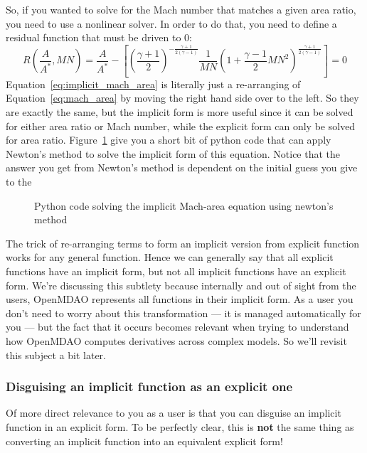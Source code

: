 \documentclass[conf]{new-aiaa}
\begin{document}
So, if you wanted to solve for the Mach number that matches a given area ratio, you need to use a nonlinear solver. 
In order to do that, you need to define a residual function that must be driven to 0: 
\begin{equation}
    R(\frac{A}{A^*}, MN) = \frac{A}{A^*} - \left[ \left(\frac{\gamma+1}{2}\right)^{-\frac{\gamma+1}{2(\gamma-1)}} 
                    \frac{1}{MN} 
                    \left( 1 + \frac{\gamma-1}{2}MN^2 \right)^{\frac{\gamma+1}{2(\gamma-1)}}\right] = 0
                    \label{eq:implicit_mach_area}
\end{equation}
Equation~\eqref{eq:implicit_mach_area} is literally just a re-arranging of Equation~\eqref{eq:mach_area} by moving the right hand side over to the left. 
So they are exactly the same, but the implicit form is more useful since it can be solved for either area ratio or Mach number, while the explicit form can only be solved for area ratio. 
Figure~\ref{fig:mach-area-implicit} give you a short bit of python code that can apply Newton's method to solve the implicit form of this equation. 
Notice that the answer you get from Newton's method is dependent on the initial guess you give to the
\begin{figure}[H]
    \centering
    
    \caption{Python code solving the implicit Mach-area equation using newton's method}
    \label{fig:mach-area-implicit}
\end{figure}

The trick of re-arranging terms to form an implicit version from explicit function works for any general function.
Hence we can generally say that all explicit functions have an implicit form, but not all implicit functions have an explicit form. 
We're discussing this subtlety because internally and out of sight from the users, OpenMDAO represents all functions in their implicit form. 
As a user you don't need to worry about this transformation --- it is managed automatically for you --- but the fact that it occurs becomes relevant when trying to understand how OpenMDAO computes derivatives across complex models.  
So we'll revisit this subject a bit later. 


\subsubsection*{Disguising an implicit function as an explicit one}
Of more direct relevance to you as a user is that you can disguise an implicit function in an explicit form. 
To be perfectly clear, this is \textbf{not} the same thing as converting an implicit function into an equivalent explicit form! 
\end{document}

